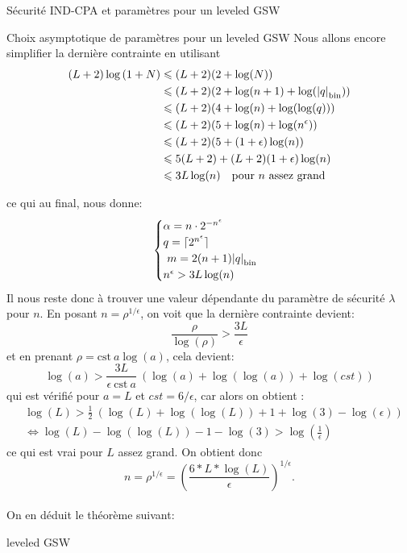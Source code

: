 \begin{section}{Sécurité IND-CPA et paramètres pour un leveled GSW}
\begin{subsection}{Choix asymptotique de paramètres pour un leveled GSW}
Nous allons encore simplifier la dernière contrainte en utilisant
\begin{align*} (L+2) \log\left( 1 + N\right) &\leqslant (L+2) (2 + \log(N)) \\
&\leqslant (L+2) (2 + \log(n+1) +  \log({|q|}_{\text{bin}})) \\
&\leqslant (L+2) (4 + \log(n) + \log(\log(q))) \\
&\leqslant (L+2) (5 + \log(n) + \log(n^\epsilon)) \\
&\leqslant (L+2) (5 + (1+\epsilon)\log(n)) \\
&\leqslant 5(L+2) + (L+2)(1+\epsilon)\log(n) \\
&\leqslant 3 L \log(n) \quad \text{pour $n$ assez grand}
\end{align*}

ce qui au final, nous donne:
\[ \begin{cases}
	\alpha  = n \cdot 2^{-n^\epsilon}  \\
	q = \lceil 2^{n^\epsilon} \rceil\\ 
	m = 2(n+1)\bnorm{q} \\  
	n^\epsilon > 3 L \log(n)
	\end{cases}  \]
Il nous reste donc à trouver une valeur dépendante du paramètre de sécurité $\lambda$ pour $n$.  En posant $n = \rho^{1/\epsilon}$, on voit que la dernière contrainte devient:
\[ \frac{\rho}{\log(\rho)} > \frac{3 L}{\epsilon}  \]
et en prenant $\rho = \text{cst}\: a \log(a)$, cela devient:
\[\log(a)> \frac{3 L}{\epsilon\:\text{cst}\: a}\:(\log(a) + \log(\log(a)) + \log(cst))   \]
qui est vérifié pour $a = L$ et $cst = 6/\epsilon$, car alors on obtient :
\begin{align*}
& \log(L)> \frac{1}{2}\:(\log(L) + \log(\log(L)) + 1 + \log(3) - \log(\epsilon)) \\
&\Leftrightarrow  \log(L) - \log(\log(L)) - 1 - \log(3) > \log(\frac{1}{\epsilon})
\end{align*}
ce qui est vrai pour $L$ assez grand.  
On obtient donc 
\[n = \rho^{1 / \epsilon}  = {\left(\frac{6 * L * \log(L)}{\epsilon}\right)}^{1 / \epsilon}.\]

\paragraph{}
On en déduit le théorème suivant:
\begin{thm}{leveled GSW}


\end{thm}
\end{subsection}
\end{section}
